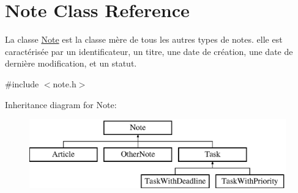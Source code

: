 \hypertarget{classNote}{}\section{Note Class Reference}
\label{classNote}


La classe \hyperlink{classNote}{Note} est la classe mère de tous les autres types de notes. elle est caractérisée par un identificateur, un titre, une date de création, une date de dernière modification, et un statut.  




{\ttfamily \#include $<$note.\+h$>$}

Inheritance diagram for Note\+:\begin{figure}[H]
\begin{center}
\leavevmode
\includegraphics[height=3.000000cm]{classNote}
\end{center}
\end{figure}
